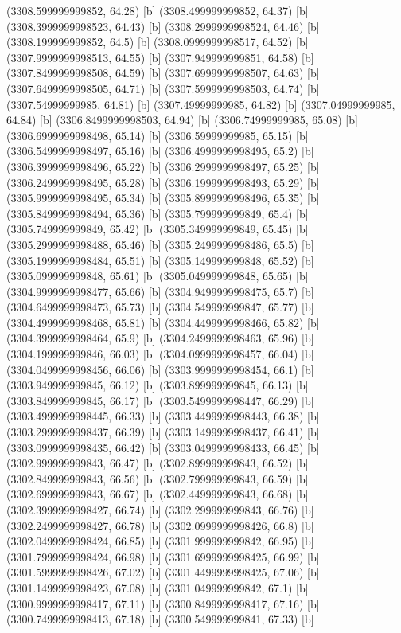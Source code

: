 {{{(3308.599999999852, 64.28) [b] 
(3308.499999999852, 64.37) [b] 
(3308.3999999998523, 64.43) [b] 
(3308.2999999998524, 64.46) [b] 
(3308.199999999852, 64.5) [b] 
(3308.0999999998517, 64.52) [b] 
(3307.9999999998513, 64.55) [b] 
(3307.949999999851, 64.58) [b] 
(3307.8499999998508, 64.59) [b] 
(3307.6999999998507, 64.63) [b] 
(3307.6499999998505, 64.71) [b] 
(3307.5999999998503, 64.74) [b] 
(3307.54999999985, 64.81) [b] 
(3307.49999999985, 64.82) [b] 
(3307.04999999985, 64.84) [b] 
(3306.8499999998503, 64.94) [b] 
(3306.74999999985, 65.08) [b] 
(3306.6999999998498, 65.14) [b] 
(3306.59999999985, 65.15) [b] 
(3306.5499999998497, 65.16) [b] 
(3306.4999999998495, 65.2) [b] 
(3306.3999999998496, 65.22) [b] 
(3306.2999999998497, 65.25) [b] 
(3306.2499999998495, 65.28) [b] 
(3306.1999999998493, 65.29) [b] 
(3305.9999999998495, 65.34) [b] 
(3305.8999999998496, 65.35) [b] 
(3305.8499999998494, 65.36) [b] 
(3305.799999999849, 65.4) [b] 
(3305.749999999849, 65.42) [b] 
(3305.349999999849, 65.45) [b] 
(3305.2999999998488, 65.46) [b] 
(3305.2499999998486, 65.5) [b] 
(3305.1999999998484, 65.51) [b] 
(3305.149999999848, 65.52) [b] 
(3305.099999999848, 65.61) [b] 
(3305.049999999848, 65.65) [b] 
(3304.9999999998477, 65.66) [b] 
(3304.9499999998475, 65.7) [b] 
(3304.6499999998473, 65.73) [b] 
(3304.549999999847, 65.77) [b] 
(3304.4999999998468, 65.81) [b] 
(3304.4499999998466, 65.82) [b] 
(3304.3999999998464, 65.9) [b] 
(3304.2499999998463, 65.96) [b] 
(3304.199999999846, 66.03) [b] 
(3304.0999999998457, 66.04) [b] 
(3304.0499999998456, 66.06) [b] 
(3303.9999999998454, 66.1) [b] 
(3303.949999999845, 66.12) [b] 
(3303.899999999845, 66.13) [b] 
(3303.849999999845, 66.17) [b] 
(3303.5499999998447, 66.29) [b] 
(3303.4999999998445, 66.33) [b] 
(3303.4499999998443, 66.38) [b] 
(3303.2999999998437, 66.39) [b] 
(3303.1499999998437, 66.41) [b] 
(3303.0999999998435, 66.42) [b] 
(3303.0499999998433, 66.45) [b] 
(3302.999999999843, 66.47) [b] 
(3302.899999999843, 66.52) [b] 
(3302.849999999843, 66.56) [b] 
(3302.799999999843, 66.59) [b] 
(3302.699999999843, 66.67) [b] 
(3302.449999999843, 66.68) [b] 
(3302.3999999998427, 66.74) [b] 
(3302.299999999843, 66.76) [b] 
(3302.2499999998427, 66.78) [b] 
(3302.0999999998426, 66.8) [b] 
(3302.0499999998424, 66.85) [b] 
(3301.999999999842, 66.95) [b] 
(3301.7999999998424, 66.98) [b] 
(3301.6999999998425, 66.99) [b] 
(3301.5999999998426, 67.02) [b] 
(3301.4499999998425, 67.06) [b] 
(3301.1499999998423, 67.08) [b] 
(3301.049999999842, 67.1) [b] 
(3300.9999999998417, 67.11) [b] 
(3300.8499999998417, 67.16) [b] 
(3300.7499999998413, 67.18) [b] 
(3300.549999999841, 67.33) [b] 
}}}
